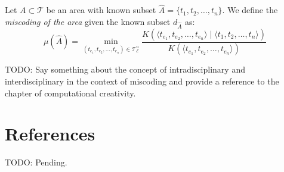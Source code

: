 \begin{definition}
Let $A \subset \mathcal{T}$ be an area with known subset $\hat{A} = \{t_1, t_2, \ldots, t_n\}$. We define the \emph{miscoding of the area} given the known subset $d_{\hat{A}}$ as:
\[
\mu(\hat{A}) = \min_{(t_{e_1}, t_{e_2}, \ldots, t_{e_n}) \in \mathcal{T}_\mathcal{E}^n}  \frac{K \left( \langle t_{e_1}, t_{e_2}, \ldots, t_{e_n} \rangle \mid \langle t_1, t_2, \ldots, t_n \rangle \right) }{K \left( \langle t_{e_1}, t_{e_2}, \ldots, t_{e_n} \rangle \right)}
\]
\end{definition}

{\color{red} TODO: Say something about the concept of intradisciplinary and interdisciplinary in the context of miscoding and provide a reference to the chapter of computational creativity.}

%
%

\section*{References}

{\color{red} TODO: Pending.}
